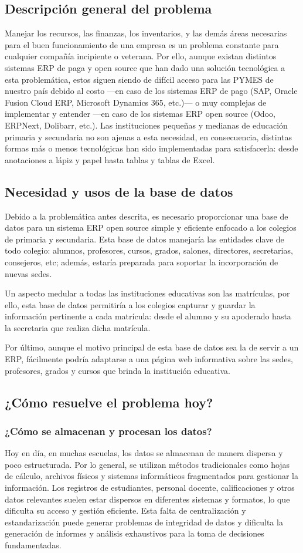\subsection{Descripción general del problema}
Manejar los recursos, las finanzas, los inventarios, y las demás áreas necesarias para el buen funcionamiento de una empresa es un problema constante para cualquier compañía incipiente o veterana. Por ello, aunque existan distintos sistemas ERP de paga y open source que han dado una solución tecnológica a esta problemática, estos siguen siendo de difícil acceso para las PYMES de nuestro país debido al costo —en caso de los sistemas ERP de pago (SAP, Oracle Fusion Cloud ERP, Microsoft Dynamics 365, etc.)— o muy complejas de implementar y entender —en caso de los sistemas ERP open source (Odoo, ERPNext, Dolibarr, etc.). Las instituciones pequeñas y medianas de educación primaria y secundaria no son ajenas a esta necesidad, en consecuencia, distintas formas más o menos tecnológicas han sido implementadas para satisfacerla: desde anotaciones a lápiz y papel hasta tablas y tablas de Excel.
\subsection{Necesidad y usos de la base de datos}
Debido a la problemática antes descrita, es necesario proporcionar una base de datos para un sistema ERP open source simple y eficiente enfocado a los colegios de primaria y secundaria. Esta base de datos manejaría las entidades clave de todo colegio: alumnos, profesores, cursos, grados, salones, directores, secretarias, consejeros, etc; además, estaría preparada para soportar la incorporación de nuevas sedes.

Un aspecto medular a todas las instituciones educativas son las matrículas, por ello, esta base de datos permitiría a los colegios capturar y guardar la información pertinente a cada matrícula: desde el alumno y su apoderado hasta la secretaria que realiza dicha matrícula.

Por último, aunque el motivo principal de esta base de datos sea la de servir a un ERP, fácilmente podría adaptarse a una página web informativa sobre las sedes, profesores, grados y cursos que brinda la institución educativa.
\subsection{¿Cómo resuelve el problema hoy?}
\subsubsection{¿Cómo se almacenan y procesan los datos?}
Hoy en día, en muchas escuelas, los datos se almacenan de manera dispersa y poco estructurada. Por lo general, se utilizan métodos tradicionales como hojas de cálculo, archivos físicos y sistemas informáticos fragmentados para gestionar la información. Los registros de estudiantes, personal docente, calificaciones y otros datos relevantes suelen estar dispersos en diferentes sistemas y formatos, lo que dificulta su acceso y gestión eficiente. Esta falta de centralización y estandarización puede generar problemas de integridad de datos y dificulta la generación de informes y análisis exhaustivos para la toma de decisiones fundamentadas.
